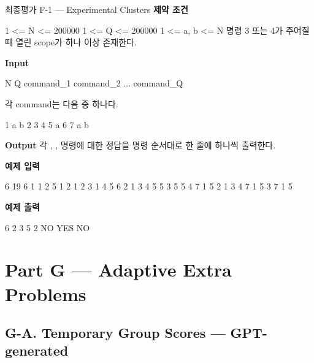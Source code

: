 \begin{problembox}{최종평가 F-1 --- Experimental Clusters}
\textbf{제약 조건}
\begin{TextBlock}
1 <= N <= 200000
1 <= Q <= 200000
1 <= a, b <= N
명령 3 또는 4가 주어질 때 열린 scope가 하나 이상 존재한다.
\end{TextBlock}

\textbf{Input}
\begin{TextBlock}
N Q
command_1
command_2
...
command_Q
\end{TextBlock}

각 command는 다음 중 하나다.
\begin{TextBlock}
1 a b
2
3
4
5 a
6
7 a b
\end{TextBlock}

\textbf{Output}
각 , ,  명령에 대한 정답을 명령 순서대로 한 줄에 하나씩 출력한다.

\textbf{예제 입력}
\begin{TextBlock}
6 19
6
1 1 2
5 1
2
1 2 3
1 4 5
6
2
1 3 4
5 5
3
5 5
4
7 1 5
2
1 3 4
7 1 5
3
7 1 5
\end{TextBlock}

\textbf{예제 출력}
\begin{TextBlock}
6
2
3
5
2
NO
YES
NO
\end{TextBlock}
\end{problembox}

\section{Part G --- Adaptive Extra Problems}

\subsection{G-A. Temporary Group Scores --- GPT-generated}

